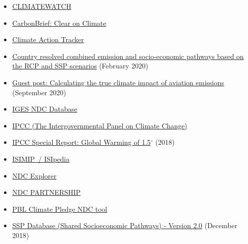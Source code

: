 \documentclass[12pt]{article}
\begin{document}
 \begin{itemize}
 \item \href{https://www.climatewatchdata.org/}{CLIMATEWATCH} 
 \vspace{-.2cm} \item \href{https://www.carbonbrief.org/}{CarbonBrief: Clear on Climate} 
 \vspace{-.2cm} \item \href{https://climateactiontracker.org/}{Climate Action Tracker} 
 \vspace{-.2cm} \item \href{https://zenodo.org/record/3638137#.X2sqPIuxU2w}{Country resolved combined emission and socio-economic pathways based on the RCP and SSP scenarios} (February 2020)
 \vspace{-.2cm} \item \href{https://www.carbonbrief.org/guest-post-calculating-the-true-climate-impact-of-aviation-emissions?utm_campaign=Carbon%20Brief%20Daily%20Briefing&utm_medium=email&utm_source=Revue%20newsletter}{Guest post: Calculating the true climate impact of aviation emissions} (September 2020)
 \vspace{-.2cm} \item \href{https://www.iges.or.jp/en/pub/iges-indc-ndc-database/en}{IGES NDC Database} 
 \vspace{-.2cm} \item \href{https://www.ipcc.ch/}{IPCC (The Intergovernmental Panel on Climate Change)} 
 \vspace{-.2cm} \item \href{https://www.ipcc.ch/sr15/}{IPCC Special Report: Global Warming of 1.5$^{\circ}$} (2018)
 \vspace{-.2cm} \item \href{https://www.isimip.org/isipedia/#isipedia-portal}{ISIMIP~/ ISIpedia} 
 \vspace{-.2cm} \item \href{https://klimalog.die-gdi.de/ndc/#NDCExplorer/worldMap?NDC??income???catIncome}{NDC Explorer} 
 \vspace{-.2cm} \item \href{https://ndcpartnership.org/}{NDC PARTNERSHIP} 
 \vspace{-.2cm} \item \href{https://themasites.pbl.nl/o/climate-ndc-policies-tool/}{PBL Climate Pledge NDC tool} 
 \vspace{-.2cm} \item \href{https://tntcat.iiasa.ac.at/SspDb/dsd?Action=htmlpage&page=about}{SSP Database (Shared Socioeconomic Pathways) - Version 2.0} (December 2018)

\end{itemize}
\end{document}
